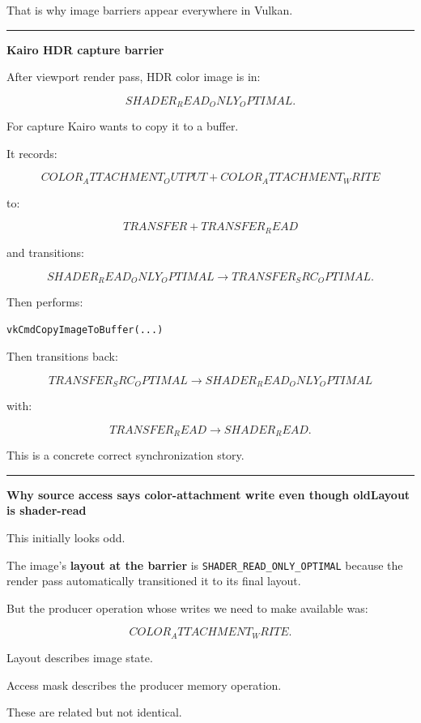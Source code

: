 That is why image barriers appear everywhere in Vulkan.

\begin{center}\rule{0.5\linewidth}{0.5pt}\end{center}

\textbf{Kairo HDR capture barrier}

After viewport render pass, HDR color image is in:

\[
SHADER_READ_ONLY_OPTIMAL.
\]

For capture Kairo wants to copy it to a buffer.

It records:

\[
COLOR_ATTACHMENT_OUTPUT
+
COLOR_ATTACHMENT_WRITE
\]

to:

\[
TRANSFER
+
TRANSFER_READ
\]

and transitions:

\[
SHADER_READ_ONLY_OPTIMAL
\rightarrow
TRANSFER_SRC_OPTIMAL.
\]

Then performs:

\begin{verbatim}
vkCmdCopyImageToBuffer(...)
\end{verbatim}

Then transitions back:

\[
TRANSFER_SRC_OPTIMAL
\rightarrow
SHADER_READ_ONLY_OPTIMAL
\]

with:

\[
TRANSFER_READ
\rightarrow
SHADER_READ.
\]

This is a concrete correct synchronization story.

\begin{center}\rule{0.5\linewidth}{0.5pt}\end{center}

\textbf{Why source access says color-attachment write even though oldLayout is shader-read}

This initially looks odd.

The image's \textbf{layout at the barrier} is \texttt{SHADER\_READ\_ONLY\_OPTIMAL} because the render pass automatically transitioned it to its final layout.

But the producer operation whose writes we need to make available was:

\[
COLOR_ATTACHMENT_WRITE.
\]

Layout describes image state.

Access mask describes the producer memory operation.

These are related but not identical.

